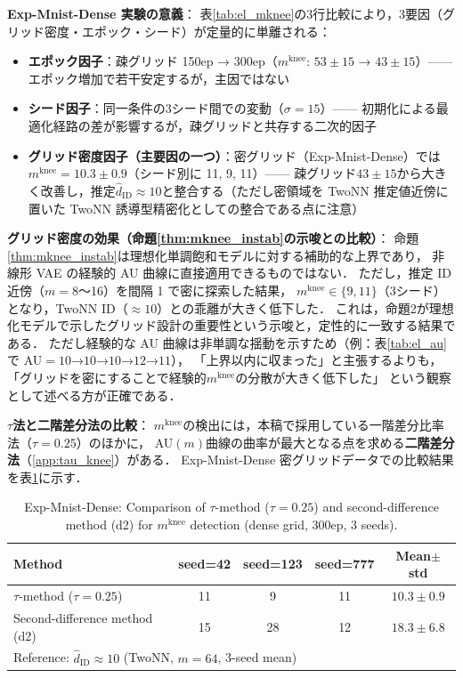 \documentclass[11pt,a4paper]{jsarticle}
\newcommand{\mknee}{m^{\mathrm{knee}}}
\begin{document}
\textbf{Exp-Mnist-Dense 実験の意義}：
表\ref{tab:el_mknee}の3行比較により，3要因（グリッド密度・エポック・シード）が定量的に単離される：
\begin{itemize}
  \item \textbf{エポック因子}：疎グリッド 150ep → 300ep（$\mknee$: $53\pm15$ → $43\pm15$）—— エポック増加で若干安定するが，主因ではない
  \item \textbf{シード因子}：同一条件の3シード間での変動（$\sigma = 15$）—— 初期化による最適化経路の差が影響するが，疎グリッドと共存する二次的因子
  \item \textbf{グリッド密度因子（主要因の一つ）}：密グリッド（Exp-Mnist-Dense）では$\mknee = 10.3 \pm 0.9$（シード別に 11, 9, 11）—— 疎グリッド$43\pm15$から大きく改善し，推定$\hat{d}_\mathrm{ID} \approx 10$と整合する（ただし密領域を TwoNN 推定値近傍に置いた TwoNN 誘導型精密化としての整合である点に注意）
\end{itemize}

\noindent
\textbf{グリッド密度の効果（命題\ref{thm:mknee_instab}の示唆との比較）}：
命題\ref{thm:mknee_instab}は理想化単調飽和モデルに対する補助的な上界であり，
非線形 VAE の経験的 AU 曲線に直接適用できるものではない．
ただし，推定 ID 近傍（$m = 8$〜16）を間隔 1 で密に探索した結果，
$\mknee \in \{9, 11\}$（3シード）となり，TwoNN ID（$\approx 10$）との乖離が大きく低下した．
これは，命題2が理想化モデルで示したグリッド設計の重要性という示唆と，定性的に一致する結果である．
ただし経験的な AU 曲線は非単調な揺動を示すため（例：表\ref{tab:el_au}で AU$=10$→$10$→$10$→$12$→$11$），
「上界以内に収まった」と主張するよりも，「グリッドを密にすることで経験的$\mknee$の分散が大きく低下した」
という観察として述べる方が正確である．

\noindent
\textbf{$\tau$法と二階差分法の比較}：
$\mknee$の検出には，本稿で採用している一階差分比率法（$\tau = 0.25$）のほかに，
AU$(m)$曲線の曲率が最大となる点を求める\textbf{二階差分法}（\ref{app:tau_knee}）がある．
Exp-Mnist-Dense 密グリッドデータでの比較結果を表\ref{tab:el_knee_compare}に示す．

\begin{table}[H]
\centering
\caption{Exp-Mnist-Dense: Comparison of $\tau$-method ($\tau=0.25$) and second-difference method (d2) for $\mknee$ detection (dense grid, 300ep, 3 seeds).}
\label{tab:el_knee_compare}
\small
\begin{tabular}{lcccc}
\toprule
Method & seed=42 & seed=123 & seed=777 & Mean$\pm$std \\
\midrule
$\tau$-method ($\tau=0.25$) & 11 & 9  & 11 & $10.3 \pm 0.9$ \\
Second-difference method (d2) & 15 & 28 & 12 & $18.3 \pm 6.8$ \\
\midrule
\multicolumn{5}{l}{Reference: $\hat{d}_\mathrm{ID} \approx 10$ (TwoNN, $m=64$, 3-seed mean)} \\
\bottomrule
\end{tabular}
\end{table}
\end{document}

